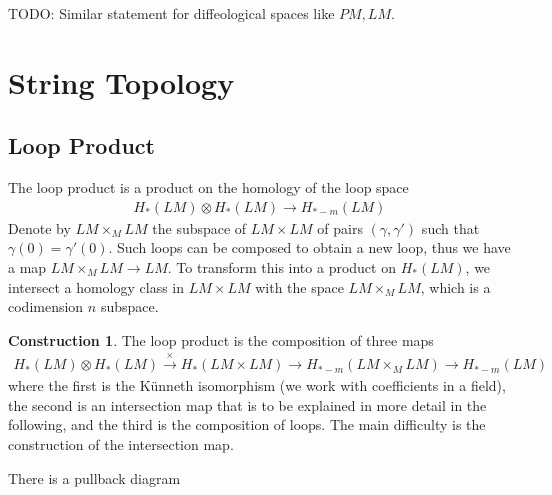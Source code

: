 \documentclass{scrartcl}
\theoremstyle{plain}
\theoremstyle{definition}
\newtheorem{construction}[theorem]{Construction}
\newcommand{\iso}{\cong}
\newcommand{\defeq}{\coloneqq}
\let\xto\xrightarrow
\let\xfrom\xleftarrow
\begin{document}
    TODO: Similar statement for diffeological spaces like $PM, LM$.








\section{String Topology}

\subsection{Loop Product}
The loop product is a product on the homology of the loop space 
\begin{align*}
    H_*(LM)\otimes H_*(LM)\to H_{*-m}(LM)
\end{align*}
Denote by $LM\times_M LM$ the subspace of $LM\times LM$ of pairs $(\gamma, \gamma')$ such that $\gamma(0) = \gamma'(0)$. Such loops can be composed to obtain a new loop, thus we have a map $LM\times_M LM\to LM$. To transform this into a product on $H_*(LM)$, we intersect a homology class in $LM\times LM$ with the space $LM\times_M LM$, which is a codimension $n$ subspace.

\begin{construction}
The loop product is the composition of three maps
\begin{align*}
    H_*(LM)\otimes H_*(LM)\xto{\times} H_{*}(LM\times LM)\xto{} H_{*-m}(LM\times_M LM)\to H_{*-m}(LM)
\end{align*}
where the first is the Künneth isomorphism (we work with coefficients in a field), the second is an intersection map that is to be explained in more detail in the following, and the third is the composition of loops. The main difficulty is the construction of the intersection map.
\end{construction}

There is a pullback diagram

\begin{center}
\end{center}


\end{document}
